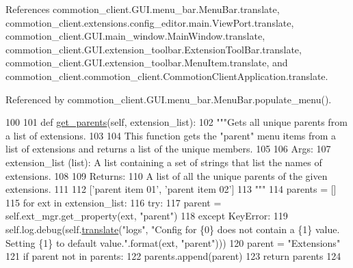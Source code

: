 References commotion\-\_\-client.\-G\-U\-I.\-menu\-\_\-bar.\-Menu\-Bar.\-translate, commotion\-\_\-client.\-extensions.\-config\-\_\-editor.\-main.\-View\-Port.\-translate, commotion\-\_\-client.\-G\-U\-I.\-main\-\_\-window.\-Main\-Window.\-translate, commotion\-\_\-client.\-G\-U\-I.\-extension\-\_\-toolbar.\-Extension\-Tool\-Bar.\-translate, commotion\-\_\-client.\-G\-U\-I.\-extension\-\_\-toolbar.\-Menu\-Item.\-translate, and commotion\-\_\-client.\-commotion\-\_\-client.\-Commotion\-Client\-Application.\-translate.



Referenced by commotion\-\_\-client.\-G\-U\-I.\-menu\-\_\-bar.\-Menu\-Bar.\-populate\-\_\-menu().


\begin{DoxyCode}
100 
101     \textcolor{keyword}{def }\hyperlink{classcommotion__client_1_1GUI_1_1menu__bar_1_1MenuBar_a963ca3542a8f9ee6c8e8534fe530d443}{get\_parents}(self, extension\_list):
102         \textcolor{stringliteral}{"""Gets all unique parents from a list of extensions.}
103 \textcolor{stringliteral}{}
104 \textcolor{stringliteral}{        This function gets the "parent" menu items from a list of extensions and returns a list of the
       unique members.}
105 \textcolor{stringliteral}{}
106 \textcolor{stringliteral}{        Args:}
107 \textcolor{stringliteral}{          extension\_list (list): A list containing a set of strings that list the names of extensions.}
108 \textcolor{stringliteral}{}
109 \textcolor{stringliteral}{        Returns:}
110 \textcolor{stringliteral}{          A list of all the unique parents of the given extensions.}
111 \textcolor{stringliteral}{        }
112 \textcolor{stringliteral}{            ['parent item 01', 'parent item 02']}
113 \textcolor{stringliteral}{        """}
114         parents = []
115         \textcolor{keywordflow}{for} ext \textcolor{keywordflow}{in} extension\_list:
116             \textcolor{keywordflow}{try}:
117                 parent = self.ext\_mgr.get\_property(ext, \textcolor{stringliteral}{"parent"})
118             \textcolor{keywordflow}{except} KeyError:
119                 self.log.debug(self.\hyperlink{classcommotion__client_1_1GUI_1_1menu__bar_1_1MenuBar_ad97dbe989a68d0453584c7c95137b8b4}{translate}(\textcolor{stringliteral}{"logs"}, \textcolor{stringliteral}{"Config for \{0\} does not contain a \{1\}
       value. Setting \{1\} to default value."}.format(ext, \textcolor{stringliteral}{"parent"})))
120                 parent = \textcolor{stringliteral}{"Extensions"}
121             \textcolor{keywordflow}{if} parent \textcolor{keywordflow}{not} \textcolor{keywordflow}{in} parents:
122                 parents.append(parent)
123         \textcolor{keywordflow}{return} parents
124 

\end{DoxyCode}
